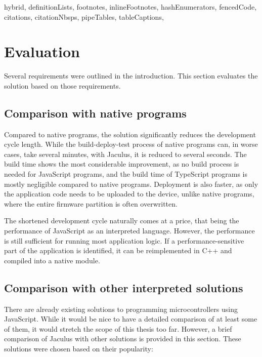 \begin{markdown*}{%
  hybrid,
  definitionLists,
  footnotes,
  inlineFootnotes,
  hashEnumerators,
  fencedCode,
  citations,
  citationNbsps,
  pipeTables,
  tableCaptions,
}


\chapter{Evaluation}

Several requirements were outlined in the introduction. This section evaluates the solution based on those requirements.

\section{Comparison with native programs}

Compared to native programs, the solution significantly reduces the development cycle length. While the build-deploy-test process of native programs can, in worse cases, take several minutes, with Jaculus, it is reduced to several seconds. The build time shows the most considerable improvement, as no build process is needed for JavaScript programs, and the build time of TypeScript programs is mostly negligible compared to native programs. Deployment is also faster, as only the application code needs to be uploaded to the device, unlike native programs, where the entire firmware partition is often overwritten.

The shortened development cycle naturally comes at a price, that being the performance of JavaScript as an interpreted language. However, the performance is still sufficient for running most application logic. If a performance-sensitive part of the application is identified, it can be reimplemented in C++ and compiled into a native module.

\section{Comparison with other interpreted solutions}

There are already existing solutions to programming microcontrollers using JavaScript. While it would be nice to have a detailed comparison of at least some of them, it would stretch the scope of this thesis too far. However, a brief comparison of Jaculus with other solutions is provided in this section. These solutions were chosen based on their popularity:


\end{markdown*}
